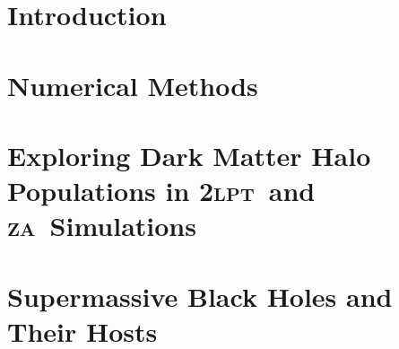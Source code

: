 \documentclass[12pt]{report}
\newcommand{\lpt}{\textsc{2lpt}}
\newcommand{\za}{\textsc{za}}
\begin{document}
\singlespacing
\tableofcontents

\begingroup
\setlength{\parskip}{1\baselineskip}
\listoftables
\newpage
\listoffigures
\newpage
\printnomenclature
\newpage
\endgroup

\normalsize
\doublespacing
{}
\setcounter{page}{1}


\chapter{Introduction}
\label{chap:introduction}






\chapter{Numerical Methods}
\label{chap:methods}










\chapter{Exploring Dark Matter Halo Populations in \lpt\ and \za\ Simulations}
\label{chap:2lpt}









\chapter{Supermassive Black Holes and Their Hosts}
\label{chap:smbhs}
\end{document}
